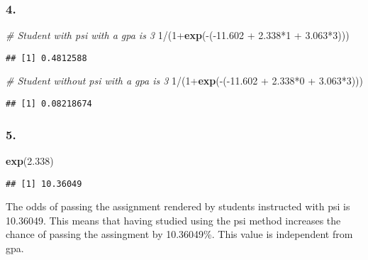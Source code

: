 \documentclass[11pt,]{article}
\newenvironment{Shaded}{\begin{snugshade}}{\end{snugshade}}
\newcommand{\KeywordTok}[1]{\textcolor[rgb]{0.13,0.29,0.53}{\textbf{{#1}}}}
\newcommand{\DecValTok}[1]{\textcolor[rgb]{0.00,0.00,0.81}{{#1}}}
\newcommand{\FloatTok}[1]{\textcolor[rgb]{0.00,0.00,0.81}{{#1}}}
\newcommand{\StringTok}[1]{\textcolor[rgb]{0.31,0.60,0.02}{{#1}}}
\newcommand{\CommentTok}[1]{\textcolor[rgb]{0.56,0.35,0.01}{\textit{{#1}}}}
\newcommand{\NormalTok}[1]{{#1}}
\begin{document}
\subsubsection{4.}\label{section-10}

\begin{Shaded}
\begin{Highlighting}[]
\CommentTok{# Student with psi with a gpa is 3}
\DecValTok{1}\NormalTok{/(}\DecValTok{1}\NormalTok{+}\KeywordTok{exp}\NormalTok{(-(-}\FloatTok{11.602} \NormalTok{+}\StringTok{ }\FloatTok{2.338}\NormalTok{*}\DecValTok{1} \NormalTok{+}\StringTok{ }\FloatTok{3.063}\NormalTok{*}\DecValTok{3}\NormalTok{)))}
\end{Highlighting}
\end{Shaded}

\begin{verbatim}
## [1] 0.4812588
\end{verbatim}

\begin{Shaded}
\begin{Highlighting}[]
\CommentTok{# Student without psi with a gpa is 3}
\DecValTok{1}\NormalTok{/(}\DecValTok{1}\NormalTok{+}\KeywordTok{exp}\NormalTok{(-(-}\FloatTok{11.602} \NormalTok{+}\StringTok{ }\FloatTok{2.338}\NormalTok{*}\DecValTok{0} \NormalTok{+}\StringTok{ }\FloatTok{3.063}\NormalTok{*}\DecValTok{3}\NormalTok{)))}
\end{Highlighting}
\end{Shaded}

\begin{verbatim}
## [1] 0.08218674
\end{verbatim}

\subsubsection{5.}\label{section-11}

\begin{Shaded}
\begin{Highlighting}[]
\KeywordTok{exp}\NormalTok{(}\FloatTok{2.338}\NormalTok{)}
\end{Highlighting}
\end{Shaded}

\begin{verbatim}
## [1] 10.36049
\end{verbatim}

The odds of passing the assignment rendered by students instructed with
psi is 10.36049. This means that having studied using the psi method
increases the chance of passing the assingment by 10.36049\%. This value
is independent from gpa.
\end{document}
